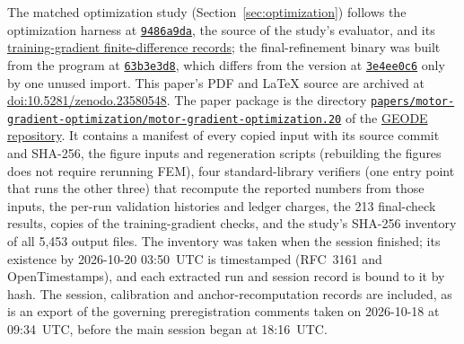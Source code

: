 \documentclass{anvil-paper}
\begin{document}
\begin{sloppypar}
The matched optimization study (Section~\ref{sec:optimization}) follows the
optimization harness at
\href{https://github.com/rjwalters/geode-fem/tree/9486a9da58beeca91968d4d3608f06b998abff45/benchmarks/motor_optimization}{\texttt{9486a9da}},
the source of the study's evaluator, and its
\href{https://github.com/rjwalters/geode-fem/tree/9486a9da58beeca91968d4d3608f06b998abff45/benchmarks/motor_optimization/runs}{training-gradient finite-difference records};
the final-refinement binary was built from the program at
\href{https://github.com/rjwalters/geode-fem/blob/63b3e3d8bbc30504f845eebb5b78e8be6a2ee12f/crates/geode-core/examples/icem_final_refinement.rs}{\texttt{63b3e3d8}},
which differs from the version at
\href{https://github.com/rjwalters/geode-fem/blob/3e4ee0c63a86dbf014a76c9faf04dd962da16911/crates/geode-core/examples/icem_final_refinement.rs}{\texttt{3e4ee0c6}}
only by one unused import.
This paper's PDF and \LaTeX{} source are archived at
\href{https://doi.org/10.5281/zenodo.23580548}{doi:10.5281/zenodo.23580548}.
The paper package is the directory
\href{https://github.com/rjwalters/geode-fem/tree/main/papers/motor-gradient-optimization/motor-gradient-optimization.20}{\texttt{papers/}\allowbreak\texttt{motor-gradient-optimization/}\allowbreak\texttt{motor-gradient-optimization.20}}
of the \href{https://github.com/rjwalters/geode-fem}{GEODE repository}. It
contains a manifest of every copied input with its source commit and
SHA-256, the figure inputs and regeneration scripts (rebuilding the figures
does not require rerunning FEM), four standard-library verifiers (one
entry point that runs the other three) that recompute the reported numbers
from those inputs, the per-run validation
histories and ledger charges, the 213 final-check results, copies of the
training-gradient checks, and the study's SHA-256 inventory of all 5,453
output files. The inventory was taken when the session finished; its
existence by 2026-10-20 03:50~UTC is timestamped (RFC~3161 and
OpenTimestamps), and each extracted run and session record is bound to it
by hash. The session, calibration and anchor-recomputation records are
included, as is an export of the governing preregistration comments taken
on 2026-10-18 at 09:34~UTC, before the main session began at 18:16~UTC.
\end{sloppypar}
\end{document}
